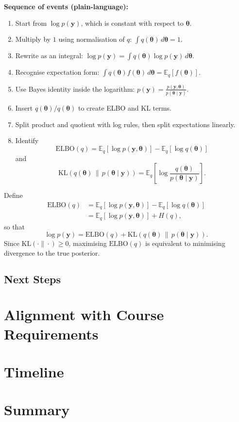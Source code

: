 \documentclass[11pt]{article}
\newcommand{\E}{\mathbb{E}}
\newcommand{\ELBO}{\mathrm{ELBO}}
\begin{document}
\textbf{Sequence of events (plain-language):}
\begin{enumerate}
\item Start from $\log p(\bm y)$, which is constant with respect to $\bm\theta$.
\item Multiply by $1$ using normalisation of $q$: $\int q(\bm\theta)\,d\bm\theta=1$.
\item Rewrite as an integral: $\log p(\bm y)=\int q(\bm\theta)\log p(\bm y)\,d\bm\theta$.
\item Recognise expectation form: $\int q(\bm\theta)f(\bm\theta)\,d\bm\theta=\E_q[f(\bm\theta)]$.
\item Use Bayes identity inside the logarithm: $p(\bm y)=\frac{p(\bm y,\bm\theta)}{p(\bm\theta\mid\bm y)}$.
\item Insert $q(\bm\theta)/q(\bm\theta)$ to create ELBO and KL terms.
\item Split product and quotient with log rules, then split expectations linearly.
\item Identify
\[\ELBO(q)=\E_q[\log p(\bm y,\bm\theta)]-\E_q[\log q(\bm\theta)]\]
and
\[\mathrm{KL}\!\left(q(\bm\theta)\,\|\,p(\bm\theta\mid\bm y)\right)=\E_q\!\left[\log\frac{q(\bm\theta)}{p(\bm\theta\mid\bm y)}\right].\]
\end{enumerate}

Define
\begin{align}
\ELBO(q)
&= \E_q[\log p(\bm y,\bm\theta)]-\E_q[\log q(\bm\theta)] \\
&= \E_q[\log p(\bm y,\bm\theta)] + H(q),
\end{align}
so that
\begin{equation}
\log p(\bm y) = \ELBO(q) + \mathrm{KL}\!\left(q(\bm\theta)\,\|\,p(\bm\theta\mid\bm y)\right).
\end{equation}
Since $\mathrm{KL}(\cdot\|\cdot)\ge 0$, maximising $\ELBO(q)$ is equivalent to minimising divergence to the true posterior.
 

\subsection*{Next Steps}


\section*{Alignment with Course Requirements}


\section*{Timeline}


\section*{Summary}
\end{document}
